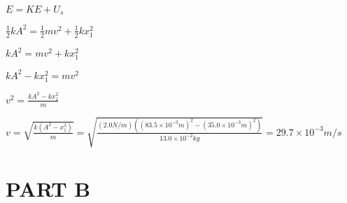 \documentclass{article}
\begin{document}

\begin{center}
$ E = KE + U_s
$

$\frac{1}{2}kA^2 = \frac{1}{2}mv^2 + \frac{1}{2}kx_1^2
$

$kA^2 = mv^2 + kx_1^2
$

$kA^2 - kx_1^2 = mv^2
$

$v^2 = \frac{kA^2 - kx_1^2}{m}
$

$\boxed{v = \sqrt{\frac{k\left(A^2 - x_1^2\right)}{m}} =  \sqrt{\frac{(2.0N/m)\left((83.5\times10^{-3}m)^2 - (35.0\times10^{-3}m)^2\right)}{13.0\times10^{-2}kg}} = 29.7\times10^{-3}m/s}
$

\end{center}

\section{PART B} 
\end{document}
